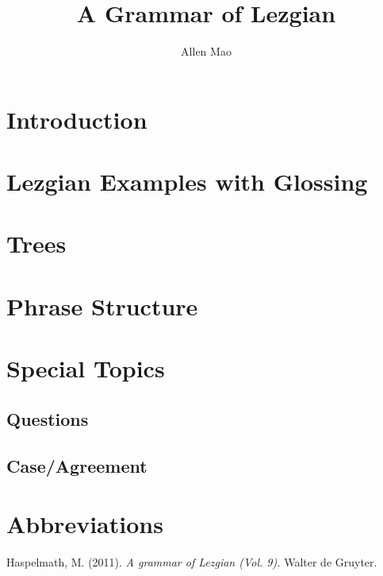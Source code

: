 \documentclass[12pt, letterpaper]{article}
\title{A Grammar of Lezgian}
\date{}
\author{Allen Mao}
\begin{document}
\maketitle
\section{Introduction}
\label{sec:intro}

\section*{Lezgian Examples with Glossing}

\section*{Trees}
\label{sec:trees}

\section{Phrase Structure}

\section{Special Topics}
\label{sec:spec-topics}
\subsection{Questions}

\subsection{Case/Agreement}

\section{Abbreviations}
\printglossaries
\begin{thebibliography}{}
Haspelmath, M. (2011). \textit{A grammar of Lezgian (Vol. 9).} Walter de Gruyter.

\end{thebibliography}
\end{document}
